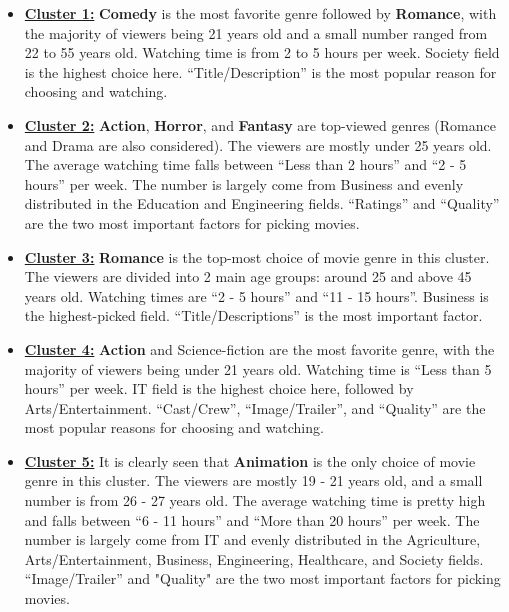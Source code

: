 \begin{itemize}
    \item \textbf{\underline{Cluster 1:}} \textbf{Comedy} is the most favorite genre followed by \textbf{Romance}, with the majority of viewers being 21 years old and a small number ranged from 22 to 55 years old. Watching time is from 2 to 5 hours per week. Society field is the highest choice here. “Title/Description” is the most popular reason for choosing and watching.

    \item \textbf{\underline{Cluster 2:}} \textbf{Action}, \textbf{Horror}, and \textbf{Fantasy} are top-viewed genres (Romance and Drama are also considered). The viewers are mostly under 25 years old. The average watching time falls between “Less than 2 hours” and “2 - 5 hours” per week. The number is largely come from Business and evenly distributed in the Education and Engineering fields. “Ratings” and “Quality” are the two most important factors for picking movies.

    \item \textbf{\underline{Cluster 3:}} \textbf{Romance} is the top-most choice of movie genre in this cluster. The viewers are divided into 2 main age groups: around 25 and above 45 years old. Watching times are “2 - 5 hours” and “11 - 15 hours”. Business is the highest-picked field. “Title/Descriptions” is the most important factor.


    \item \textbf{\underline{Cluster 4:}} \textbf{Action} and Science-fiction are the most favorite genre, with the majority of viewers being under 21 years old. Watching time is “Less than 5 hours” per week. IT field is the highest choice here, followed by Arts/Entertainment. “Cast/Crew”, “Image/Trailer”, and “Quality” are the most popular reasons for choosing and watching.

    \item \textbf{\underline{Cluster 5:}} It is clearly seen that \textbf{Animation} is the only choice of movie genre in this cluster. The viewers are mostly 19 - 21 years old, and a small number is from 26 - 27 years old. The average watching time is pretty high and falls between “6 - 11 hours” and “More than 20 hours” per week. The number is largely come from IT and evenly distributed in the Agriculture, Arts/Entertainment, Business, Engineering, Healthcare, and Society fields. “Image/Trailer” and "Quality" are the two most important factors for picking movies.


\end{itemize}
